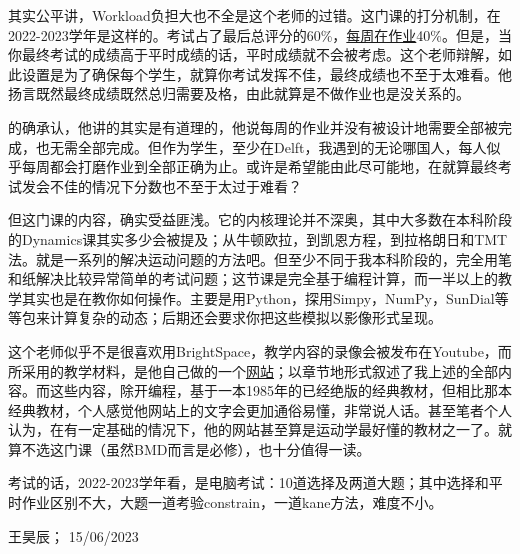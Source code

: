 其实公平讲，Workload负担大也不全是这个老师的过错。这门课的打分机制，在2022-2023学年是这样的。考试占了最后总评分的60\%，\href{https://drive.google.com/file/d/1bz5jCnF8Walknjwm1NXwLhsIZyFFHFMX/view?usp=sharing}{每周在作业}40\%。但是，当你最终考试的成绩高于平时成绩的话，平时成绩就不会被考虑。这个老师辩解，如此设置是为了确保每个学生，就算你考试发挥不佳，最终成绩也不至于太难看。他扬言既然最终成绩既然总归需要及格，由此就算是不做作业也是没关系的。

的确承认，他讲的其实是有道理的，他说每周的作业并没有被设计地需要全部被完成，也无需全部完成。但作为学生，至少在Delft，我遇到的无论哪国人，每人似乎每周都会打磨作业到全部正确为止。或许是希望能由此尽可能地，在就算最终考试发会不佳的情况下分数也不至于太过于难看？

但这门课的内容，确实受益匪浅。它的内核理论并不深奥，其中大多数在本科阶段的Dynamics课其实多少会被提及；从牛顿欧拉，到凯恩方程，到拉格朗日和TMT法。就是一系列的解决运动问题的方法吧。但至少不同于我本科阶段的，完全用笔和纸解决比较异常简单的考试问题；这节课是完全基于编程计算，而一半以上的教学其实也是在教你如何操作。主要是用Python，探用Simpy，NumPy，SunDial等等包来计算复杂的动态；后期还会要求你把这些模拟以影像形式呈现。

这个老师似乎不是很喜欢用BrightSpace，教学内容的录像会被发布在Youtube，而所采用的教学材料，是他自己做的一个\href{https://moorepants.github.io/learn-multibody-dynamics/}{\uline{网站}}；以章节地形式叙述了我上述的全部内容。而这些内容，除开编程，基于一本1985年的已经绝版的经典教材，但相比那本经典教材，个人感觉他网站上的文字会更加通俗易懂，非常说人话。甚至笔者个人认为，在有一定基础的情况下，他的网站甚至算是运动学最好懂的教材之一了。就算不选这门课（虽然BMD而言是必修），也十分值得一读。

考试的话，2022-2023学年看，是电脑考试：10道选择及两道大题；其中选择和平时作业区别不大，大题一道考验constrain，一道kane方法，难度不小。
\begin{flushright}
王昊辰； 15/06/2023
\end{flushright}

